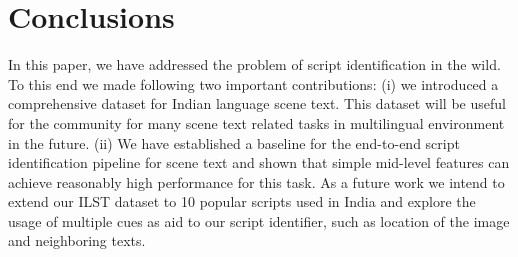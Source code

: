 \section{Conclusions}
In this paper, we have addressed the problem of script identification in the wild. To this end we made following two important contributions: (i) we introduced a comprehensive dataset for Indian language scene text. This dataset will be useful for the community 
for many scene text related tasks in multilingual environment in the future. (ii) We have established a baseline for the end-to-end script identification pipeline for scene text and shown that simple mid-level features can achieve reasonably high performance for this task. As a future work we intend to extend our ILST dataset to 10 popular scripts used in India and explore the usage of multiple cues as aid to our script identifier, such as location of the image and neighboring texts. 

\label{sec:con}
